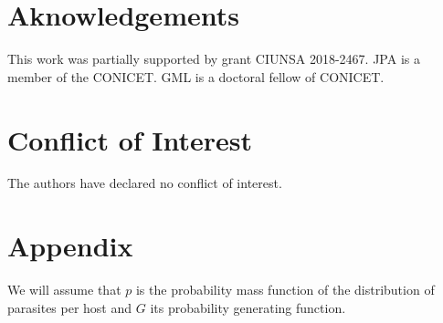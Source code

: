 \documentclass[12pt,a4paper]{article}
\theoremstyle{plain}%
\theoremstyle{definition}
\theoremstyle{remark}
\begin{document}
	
	\section*{Aknowledgements}
	
	This work was partially supported by grant CIUNSA 2018-2467. JPA is a member of the CONICET. GML is a doctoral fellow of CONICET.
	
	\section*{Conflict of Interest}
	
	The authors have declared no conflict of interest.
	
	
	
		


	\appendix
	\section{Appendix}
	We will assume that $p$ is the probability mass function of the distribution of parasites per host and $G$ its probability generating function.
	
\end{document}
